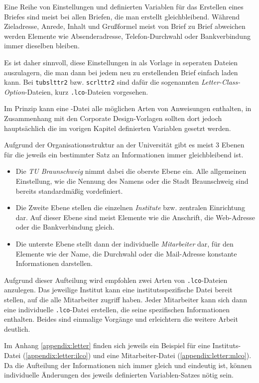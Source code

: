 Eine Reihe von Einstellungen und definierten Variablen für das Erstellen eines
Briefes sind meist bei allen Briefen, die man erstellt gleichbleibend.
Während Zieladresse, Anrede, Inhalt und Grußformel meist von Brief zu Brief
abweichen werden Elemente wie Absenderadresse, Telefon-Durchwahl oder
Bankverbindung immer dieselben bleiben.

Es ist daher sinnvoll, diese Einstellungen in als Vorlage in seperaten Dateien
auszulagern, die man dann bei jedem neu zu erstellenden Brief einfach laden
kann. Bei \texttt{tubslttr2} bzw. \texttt{scrlttr2} sind dafür die sogenannten
\emph{Letter-Class-Option}-Dateien, kurz \texttt{.lco}-Dateien vorgesehen.

Im Prinzip kann eine -Datei alle möglichen Arten von Anweisungen
enthalten, in Zusammenhang mit den Corporate Design-Vorlagen sollten dort jedoch
hauptsächlich die im vorigen Kapitel definierten Variablen gesetzt werden.

Aufgrund der Organisationsstruktur an der Universität gibt es meist 3 Ebenen für
die jeweils ein bestimmter Satz an Informationen immer gleichbleibend ist.

\begin{itemize}
  \item Die \emph{TU Braunschweig} nimmt dabei die oberste Ebene ein. Alle allgemeinen
    Einstellung, wie die Nennung des Namens oder die Stadt Braunschweig sind
    bereits standardmäßig vordefiniert.

  \item Die Zweite Ebene stellen die einzelnen \emph{Institute} bzw.
    zentralen Einrichtung dar. Auf dieser Ebene sind meist Elemente wie die
    Anschrift, die Web-Adresse oder die Bankverbindung gleich.

  \item Die unterste Ebene stellt dann der individuelle \emph{Mitarbeiter} dar,
    für den Elemente wie der Name, die Durchwahl oder die Mail-Adresse konstante
    Informationen darstellen.
\end{itemize}

Aufgrund dieser Aufteilung wird empfohlen zwei Arten von \texttt{.lco}-Dateien
anzulegen. Das jeweilige Institut kann eine institutsspezifische Datei
bereit stellen, auf die alle Mitarbeiter zugriff haben. Jeder Mitarbeiter kann
sich dann eine individuelle \texttt{.lco}-Datei erstellen, die seine spezifischen
Informationen enthalten. Beides sind einmalige Vorgänge und erleichtern die
weitere Arbeit deutlich.

Im Anhang \ref{appendix:letter} finden sich jeweils ein Beispiel für eine
Instituts-Datei (\ref{appendix:letter:ilco}) und eine Mitarbeiter-Datei
(\ref{appendix:letter:mlco}). Da die Aufteilung der Informationen nich immer 
gleich und eindeutig ist, können individuelle Änderungen des jeweils definierten
Variablen-Satzes nötig sein.


